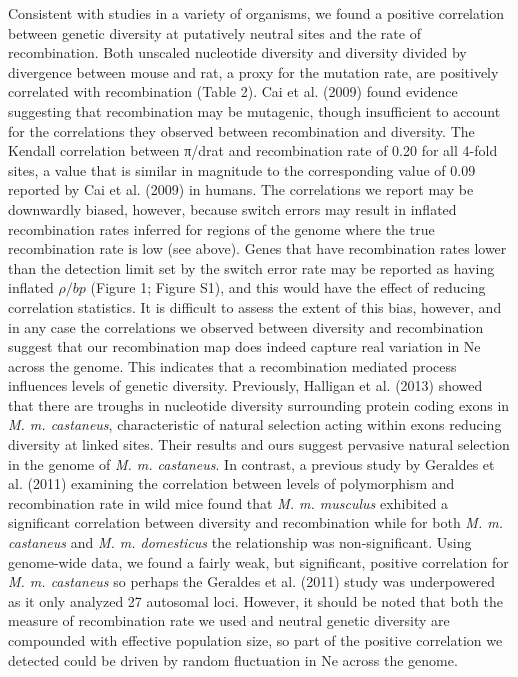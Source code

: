 	Consistent with studies in a variety of organisms, we found a positive correlation between genetic diversity at putatively neutral sites and the rate of recombination. Both unscaled nucleotide diversity and diversity divided by divergence between mouse and rat, a proxy for the mutation rate, are positively correlated with recombination (Table 2). Cai et al. (2009) found evidence suggesting that recombination may be mutagenic, though insufficient to account for the correlations they observed between recombination and diversity. The Kendall correlation between π/drat and recombination rate of 0.20 for all 4-fold sites, a value that is similar in magnitude to the corresponding value of 0.09 reported by Cai et al. (2009) in humans. The correlations we report may be downwardly biased, however, because switch errors may result in inflated recombination rates inferred for regions of the genome where the true recombination rate is low (see above). Genes that have recombination rates lower than the detection limit set by the switch error rate may be reported as having inflated $\rho / bp$ (Figure 1; Figure S1), and this would have the effect of reducing correlation statistics. It is difficult to assess the extent of this bias, however, and in any case the correlations we observed between diversity and recombination suggest that our recombination map does indeed capture real variation in Ne across the genome. This indicates that a recombination mediated process influences levels of genetic diversity. Previously, Halligan et al. (2013) showed that there are troughs in nucleotide diversity surrounding protein coding exons in \emph{M. m. castaneus}, characteristic of natural selection acting within exons reducing diversity at linked sites. Their results and ours suggest pervasive natural selection in the genome of \emph{M. m. castaneus}. In contrast, a previous study by Geraldes et al. (2011) examining the correlation between levels of polymorphism and recombination rate in wild mice found that \emph{M. m. musculus} exhibited a significant correlation between diversity and recombination while for both \emph{M. m. castaneus} and \emph{M. m. domesticus} the relationship was non-significant. Using genome-wide data, we found a fairly weak, but significant, positive correlation for \emph{M. m. castaneus} so perhaps the Geraldes et al. (2011) study was underpowered as it only analyzed 27 autosomal loci. However, it should be noted that both the measure of recombination rate we used and neutral genetic diversity are compounded with effective population size, so part of the positive correlation we detected could be driven by random fluctuation in Ne across the genome.

